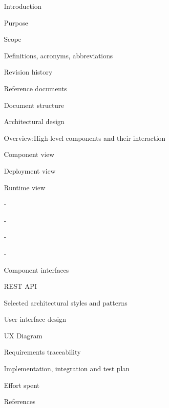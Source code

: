 \documentclass{article}
\begin{document}
	\begin{legal}
 	\item Introduction
  		\begin{legal}
    		\item Purpose
		\item Scope
		\item Definitions, acronyms, abbreviations
		\item Revision history
		\item Reference documents
		\item Document structure	
  		\end{legal}
	\item Architectural design
  		\begin{legal}
    		\item Overview:High-level components and their interaction
		\item Component view
		\item Deployment view
		\item Runtime view
			\begin{legal}
			\item -
			\item -
			\item -
			\item -
	  		\end{legal}
		\item Component interfaces
			\begin{legal}
			\item REST API
	  		\end{legal}
		\item Selected architectural styles and patterns
  		\end{legal}
	\item User interface design
  		\begin{legal}
    		\item UX Diagram
  		\end{legal}
	\item Requirements traceability
	\item Implementation, integration and test plan
  	\item Effort spent
	\item References
	\end{legal}
	
	\newpage
	\begin{legal}
	\item {}
	\item{}
	\item{}
	\item{}
	\item{}
	\item{}
	\item{}
	\end{legal}
\end{document}
